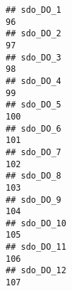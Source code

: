 \documentclass[
]{article}
\begin{document}
\begin{verbatim}
## sdo_DO_1                                                                                                                                                                                                                     96
## sdo_DO_2                                                                                                                                                                                                                     97
## sdo_DO_3                                                                                                                                                                                                                     98
## sdo_DO_4                                                                                                                                                                                                                     99
## sdo_DO_5                                                                                                                                                                                                                    100
## sdo_DO_6                                                                                                                                                                                                                    101
## sdo_DO_7                                                                                                                                                                                                                    102
## sdo_DO_8                                                                                                                                                                                                                    103
## sdo_DO_9                                                                                                                                                                                                                    104
## sdo_DO_10                                                                                                                                                                                                                   105
## sdo_DO_11                                                                                                                                                                                                                   106
## sdo_DO_12                                                                                                                                                                                                                   107

\end{verbatim}
\end{document}
